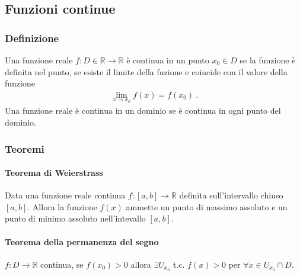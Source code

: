 \documentclass[letterpaper,10pt,english]{jupyterBook}
\begin{document}
\subsection{Funzioni continue}
\label{\detokenize{ch/infinitesimal_calculus/limits:funzioni-continue}}

\subsubsection{Definizione}
\label{\detokenize{ch/infinitesimal_calculus/limits:definizione}}
\sphinxAtStartPar
Una funzione reale \(f: D \in \mathbb{R} \rightarrow \mathbb{R}\) è continua in un punto \(x_0 \in D\) se la funzione è definita nel punto, se esiste il limite della fuzione e coincide con il valore della funzione
\begin{equation*}
\begin{split}\lim_{x \rightarrow x_0} f(x) = f(x_0) \ .\end{split}
\end{equation*}
\sphinxAtStartPar
Una funzione reale è continua in un dominio   se è continua in ogni punto del dominio.


\subsubsection{Teoremi}
\label{\detokenize{ch/infinitesimal_calculus/limits:teoremi}}

\paragraph{Teorema di Weierstrass}
\label{\detokenize{ch/infinitesimal_calculus/limits:teorema-di-weierstrass}}
\sphinxAtStartPar
{} Data una funzione reale continua \(f: [a,b] \rightarrow \mathbb{R}\) definita sull’intervallo chiuso \([a,b]\). Allora la funzione \(f(x)\) ammette un punto di massimo assoluto e un punto di minimo assoluto nell’intevallo \([a,b]\).


\paragraph{Teorema della permanenza del segno}
\label{\detokenize{ch/infinitesimal_calculus/limits:teorema-della-permanenza-del-segno}}
\sphinxAtStartPar
{} \(f: D \rightarrow \mathbb{R}\) continua, se \(f(x_0) > 0\) allora \(\exists U_{x_0}\) t.c. \(f(x) > 0\) per \(\forall x \in U_{x_0} \cap D\).
\end{document}
